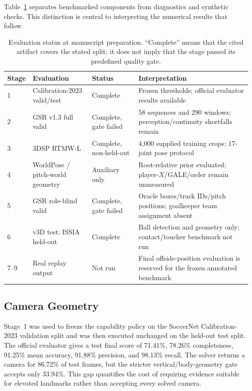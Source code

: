 \documentclass[runningheads]{llncs}
\begin{document}
Table~\ref{tab:benchmark_status} separates benchmarked components from diagnostics and synthetic checks. This distinction is central to interpreting the numerical results that follow.

\begin{table}[t]
\caption{Evaluation status at manuscript preparation. ``Complete'' means that the cited artifact covers the stated split; it does not imply that the stage passed its predefined quality gate.}
\label{tab:benchmark_status}
\centering\small
\setlength{\tabcolsep}{4pt}
\begin{tabularx}{\textwidth}{@{}p{1.1cm}p{3.0cm}p{2.0cm}X@{}}
\toprule
Stage & Evaluation & Status & Interpretation \\
\midrule
1 & Calibration-2023 valid/test & Complete & Frozen thresholds; official evaluator results available \\
2 & GSR v1.3 full valid & Complete, gate failed & 58 sequences and 290 windows; perception/continuity shortfalls remain \\
3 & 3DSP RTMW-L & Complete, non-held-out & 4,000 supplied training crops; 17-joint pose protocol \\
4 & WorldPose / pitch-world geometry & Auxiliary only & Root-relative prior evaluated; player-$X$/GALE/order remain unmeasured \\
5 & GSR role-blind valid & Complete, gate failed & Oracle boxes/track IDs/pitch positions; goalkeeper team assignment absent \\
6 & v3D test; ISSIA held-out & Complete & Ball detection and geometry only; contact/toucher benchmark not run \\
7--9 & Real replay output & Not run & Final offside-position evaluation is reserved for the frozen annotated benchmark \\
\bottomrule
\end{tabularx}
\end{table}

\subsection{Camera Geometry}
\label{subsec:results_camera}
Stage~1 was used to freeze the capability policy on the SoccerNet Calibration-2023 validation split and was then executed unchanged on the held-out test split. The official evaluator gives a test final score of 71.41\%, 78.26\% completeness, 91.25\% mean accuracy, 91.88\% precision, and 98.13\% recall. The solver returns a camera for 86.72\% of test frames, but the stricter vertical/body-geometry gate accepts only 33.94\%. This gap quantifies the cost of requiring evidence suitable for elevated landmarks rather than accepting every solved camera.
\end{document}
